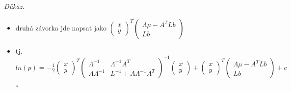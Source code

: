 \documentclass{article}
\newenvironment{pitemize}{
\begin{itemize}
  \setlength{\itemsep}{5pt}
  \setlength{\parskip}{0pt}
  \setlength{\parsep}{0pt}
}{\end{itemize}}
\newenvironment{pproof}{
\noindent\emph{Důkaz.}
\begin{pitemize}
}{\hfill$\square$\end{pitemize}}
\theoremstyle{definition}
\begin{document}
\begin{pproof}
\begin{itemize}
\item $M=\left(\Lambda+A^TLA-A^TL\left(L\right)^{-1}LA\right)^{-1}= \Lambda^{-1}$

\item $\left( \begin{matrix}\Lambda+A^TLA & -A^TL \\ -LA&L\end{matrix} \right)^{-1}=$

$=\left(\begin{matrix}
\Lambda^{-1}& %
-\Lambda^{-1}\left(-A^TL\right)L^{-1}\\ %
-L^{-1}\left(-LA\right)\Lambda^{-1}& %
L^{-1}+L^{-1}\left(-LA\right)\Lambda^{-1}\left(-A^TL\right)L^{-1} \end{matrix}\right)=$

$=\left( \begin{matrix} \Lambda^{-1}& \Lambda^{-1}A^T \\ A \Lambda^{-1} & L^{-1}+A\Lambda^{-1}A^T \end{matrix} \right)$
\item první závorka je tedy $ -\frac{1}{2}\left( \begin{matrix}x \\ y\end{matrix} \right)^T \left( \begin{matrix} \Lambda^{-1}& \Lambda^{-1}A^T \\ A \Lambda^{-1} & L^{-1}+A\Lambda^{-1}A^T \end{matrix} \right) ^{-1}\left( \begin{matrix}x \\ y\end{matrix} \right)$
\end{itemize}
\item druhá závorka jde napsat jako $\left(\begin{matrix}x\\y\end{matrix} \right)^T\left(\begin{matrix} \Lambda\mu - A^TLb \\Lb\end{matrix} \right)$
\item tj. $ln(p)= -\frac{1}{2}\left( \begin{matrix}x \\ y\end{matrix} \right)^T \left( \begin{matrix} \Lambda^{-1}& \Lambda^{-1}A^T \\ A \Lambda^{-1} & L^{-1}+A\Lambda^{-1}A^T \end{matrix} \right) ^{-1}\left( \begin{matrix}x \\ y\end{matrix} \right) + \left(\begin{matrix}x\\y\end{matrix} \right)^T\left(\begin{matrix} \Lambda\mu - A^TLb \\Lb\end{matrix} \right)+c$

\end{pproof}
\end{document}
